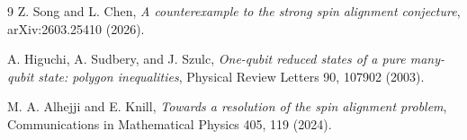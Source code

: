 \documentclass[11pt]{article}
\begin{document}
\begin{thebibliography}{9}
Z. Song and L. Chen,
\newblock \emph{A counterexample to the strong spin alignment conjecture},
\newblock arXiv:2603.25410 (2026).

A. Higuchi, A. Sudbery, and J. Szulc,
\newblock \emph{One-qubit reduced states of a pure many-qubit state:
polygon inequalities},
\newblock Physical Review Letters 90, 107902 (2003).

M. A. Alhejji and E. Knill,
\newblock \emph{Towards a resolution of the spin alignment problem},
\newblock Communications in Mathematical Physics 405, 119 (2024).
\end{thebibliography}
\end{document}
